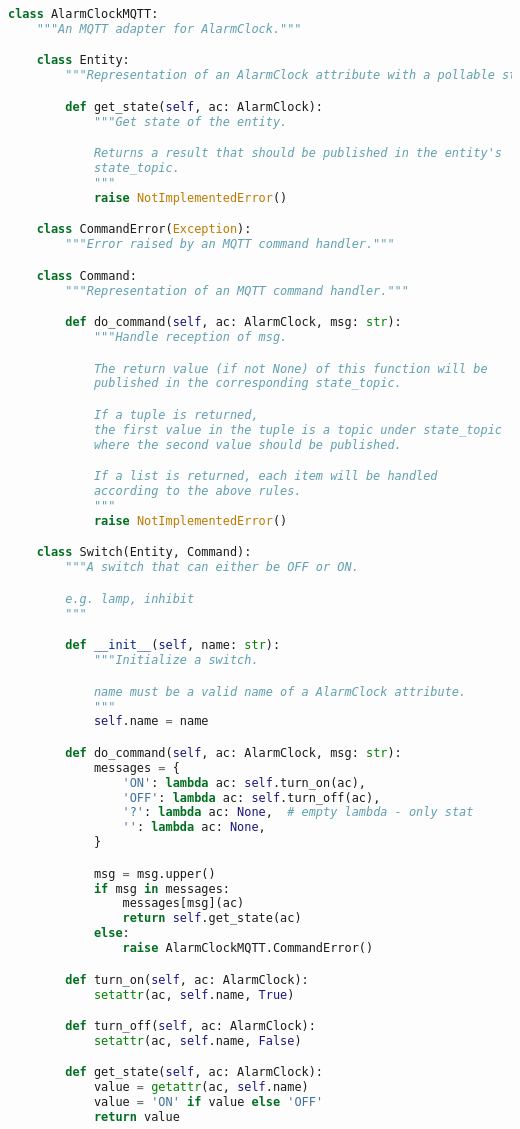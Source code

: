 \begin{lstlisting}[language=Python]
class AlarmClockMQTT:
    """An MQTT adapter for AlarmClock."""

    class Entity:
        """Representation of an AlarmClock attribute with a pollable state."""

        def get_state(self, ac: AlarmClock):
            """Get state of the entity.

            Returns a result that should be published in the entity's
            state_topic.
            """
            raise NotImplementedError()

    class CommandError(Exception):
        """Error raised by an MQTT command handler."""

    class Command:
        """Representation of an MQTT command handler."""

        def do_command(self, ac: AlarmClock, msg: str):
            """Handle reception of msg.

            The return value (if not None) of this function will be
            published in the corresponding state_topic.

            If a tuple is returned,
            the first value in the tuple is a topic under state_topic
            where the second value should be published.

            If a list is returned, each item will be handled
            according to the above rules.
            """
            raise NotImplementedError()

    class Switch(Entity, Command):
        """A switch that can either be OFF or ON.

        e.g. lamp, inhibit
        """

        def __init__(self, name: str):
            """Initialize a switch.

            name must be a valid name of a AlarmClock attribute.
            """
            self.name = name

        def do_command(self, ac: AlarmClock, msg: str):
            messages = {
                'ON': lambda ac: self.turn_on(ac),
                'OFF': lambda ac: self.turn_off(ac),
                '?': lambda ac: None,  # empty lambda - only stat
                '': lambda ac: None,
            }

            msg = msg.upper()
            if msg in messages:
                messages[msg](ac)
                return self.get_state(ac)
            else:
                raise AlarmClockMQTT.CommandError()

        def turn_on(self, ac: AlarmClock):
            setattr(ac, self.name, True)

        def turn_off(self, ac: AlarmClock):
            setattr(ac, self.name, False)

        def get_state(self, ac: AlarmClock):
            value = getattr(ac, self.name)
            value = 'ON' if value else 'OFF'
            return value
\end{lstlisting}

